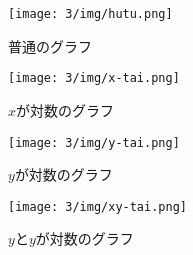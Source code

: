 \begin{figure}[htpb]
	\begin{center}
		\texttt{[image: 3/img/hutu.png]}
	\end{center}
	\caption{普通のグラフ}
\end{figure}

\begin{figure}[htpb]
	\begin{center}
		\texttt{[image: 3/img/x-tai.png]}
	\end{center}
	\caption{$x$が対数のグラフ}
\end{figure}

\begin{figure}[htpb]
	\begin{center}
		\texttt{[image: 3/img/y-tai.png]}
	\end{center}
	\caption{$y$が対数のグラフ}
\end{figure}

\begin{figure}[htpb]
	\begin{center}
		\texttt{[image: 3/img/xy-tai.png]}
	\end{center}
	\caption{$y$と$y$が対数のグラフ}
\end{figure}
